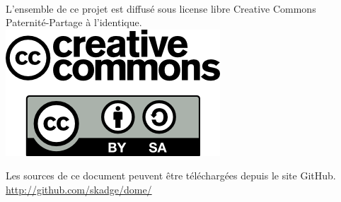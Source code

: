 \documentclass[a4paper,12pt]{report}
\begin{document}
\clearpage
\thispagestyle{empty}
~
\vfill
\begin{center}
	L'ensemble de ce projet est diffusé sous license libre Creative Commons Paternité-Partage à l'identique.\\
	\vspace{2cm}
	\includegraphics[scale=0.5]{logo_cc.png}
\end{center}

\vfill

\begin{center}
	Les sources de ce document peuvent être téléchargées depuis le site GitHub.
	\url{http://github.com/skadge/dome/}
\end{center}

\vfill
\end{document}
